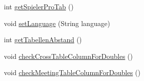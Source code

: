 \begin{DoxyCompactItemize}
int \hyperlink{classde_1_1turnierverwaltung_1_1control_1_1_properties_control_abc148569d2d3b4cf9d42f4810e1984ba}{get\+Spieler\+Pro\+Tab} ()
\item 
void \hyperlink{classde_1_1turnierverwaltung_1_1control_1_1_properties_control_acc63e7b4ec1ca017af7d2bdc4ce01d24}{set\+Language} (String language)
\item 
int \hyperlink{classde_1_1turnierverwaltung_1_1control_1_1_properties_control_a4241c67010ae0a2594bedaa7d0c9a4fb}{get\+Tabellen\+Abstand} ()
\item 
void \hyperlink{classde_1_1turnierverwaltung_1_1control_1_1_properties_control_a9340cfe750127bdac438401708a0337b}{check\+Cross\+Table\+Column\+For\+Doubles} ()
\item 
void \hyperlink{classde_1_1turnierverwaltung_1_1control_1_1_properties_control_a629ca43e74d3565190973195597c5d27}{check\+Meeting\+Table\+Column\+For\+Doubles} ()
\end{DoxyCompactItemize}
